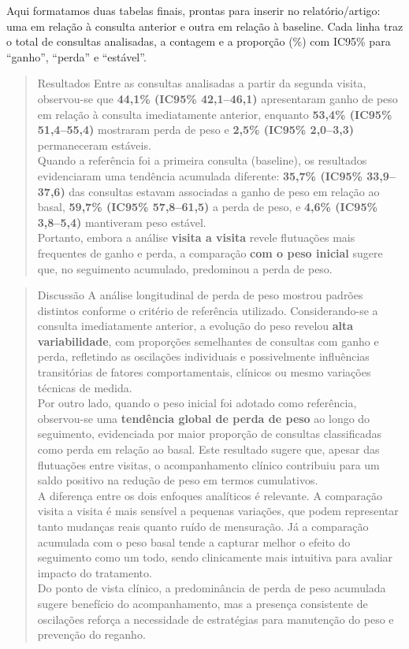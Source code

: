 \documentclass[
]{article}
\begin{document}
Aqui formatamos duas tabelas finais, prontas para inserir no
relatório/artigo: uma em relação à consulta anterior e outra em relação
à baseline. Cada linha traz o total de consultas analisadas, a contagem
e a proporção (\%) com IC95\% para ``ganho'', ``perda'' e ``estável''.

\begin{quote}
Resultados Entre as consultas analisadas a partir da segunda visita,
observou-se que \textbf{44,1\% (IC95\% 42,1--46,1)} apresentaram ganho
de peso em relação à consulta imediatamente anterior, enquanto
\textbf{53,4\% (IC95\% 51,4--55,4)} mostraram perda de peso e
\textbf{2,5\% (IC95\% 2,0--3,3)} permaneceram estáveis.\\
Quando a referência foi a primeira consulta (baseline), os resultados
evidenciaram uma tendência acumulada diferente: \textbf{35,7\% (IC95\%
33,9--37,6)} das consultas estavam associadas a ganho de peso em relação
ao basal, \textbf{59,7\% (IC95\% 57,8--61,5)} a perda de peso, e
\textbf{4,6\% (IC95\% 3,8--5,4)} mantiveram peso estável.\\
Portanto, embora a análise \textbf{visita a visita} revele flutuações
mais frequentes de ganho e perda, a comparação \textbf{com o peso
inicial} sugere que, no seguimento acumulado, predominou a perda de
peso.
\end{quote}

\begin{quote}
Discussão A análise longitudinal de perda de peso mostrou padrões
distintos conforme o critério de referência utilizado. Considerando-se a
consulta imediatamente anterior, a evolução do peso revelou \textbf{alta
variabilidade}, com proporções semelhantes de consultas com ganho e
perda, refletindo as oscilações individuais e possivelmente influências
transitórias de fatores comportamentais, clínicos ou mesmo variações
técnicas de medida.\\
Por outro lado, quando o peso inicial foi adotado como referência,
observou-se uma \textbf{tendência global de perda de peso} ao longo do
seguimento, evidenciada por maior proporção de consultas classificadas
como perda em relação ao basal. Este resultado sugere que, apesar das
flutuações entre visitas, o acompanhamento clínico contribuiu para um
saldo positivo na redução de peso em termos cumulativos.\\
A diferença entre os dois enfoques analíticos é relevante. A comparação
visita a visita é mais sensível a pequenas variações, que podem
representar tanto mudanças reais quanto ruído de mensuração. Já a
comparação acumulada com o peso basal tende a capturar melhor o efeito
do seguimento como um todo, sendo clinicamente mais intuitiva para
avaliar impacto do tratamento.\\
Do ponto de vista clínico, a predominância de perda de peso acumulada
sugere benefício do acompanhamento, mas a presença consistente de
oscilações reforça a necessidade de estratégias para manutenção do peso
e prevenção do reganho.
\end{quote}
\end{document}
